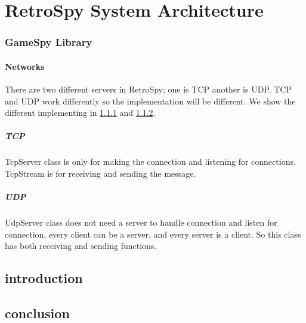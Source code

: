 \documentclass[oneside,titlepage,a4paper]{report} %
\begin{document}
\part{RetroSpy System Architecture}
\section{GameSpy Library}
	\subsection{Networks}
	 There are two different servers in RetroSpy; one is TCP another is UDP.  TCP and UDP work differently so the implementation will be different. We show the different implementing in \ref{Tcp} and \ref{Udp}.
		\subsubsection{TCP}\label{Tcp}
		    TcpServer class is only for making the connection and listening for connections. TcpStream is for receiving and sending the message.
		\subsubsection{UDP}\label{Udp}
		  UdpServer class does not need a server to handle connection and listen for connection, every client can be a server, and every server is a client. So this class has both receiving and sending functions.
\chapter{introduction}

\chapter{conclusion}
\end{document}
